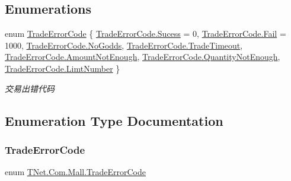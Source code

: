 \subsection*{Enumerations}
\begin{DoxyCompactItemize}
\item 
enum \mbox{\hyperlink{namespace_t_net_1_1_com_1_1_mall_a8ed58f71da1d1495830104612fc5667a}{Trade\+Error\+Code}} \{ \newline
\mbox{\hyperlink{namespace_t_net_1_1_com_1_1_mall_a8ed58f71da1d1495830104612fc5667aae86fe8e3ce45e5c58b6e88a15b0b8a0f}{Trade\+Error\+Code.\+Sucess}} = 0, 
\mbox{\hyperlink{namespace_t_net_1_1_com_1_1_mall_a8ed58f71da1d1495830104612fc5667aaceaa0734f0b3c738120c67344d8f3ec1}{Trade\+Error\+Code.\+Fail}} = 1000, 
\mbox{\hyperlink{namespace_t_net_1_1_com_1_1_mall_a8ed58f71da1d1495830104612fc5667aa6f9b3e0b940a2231afdc200ed3456726}{Trade\+Error\+Code.\+No\+Godds}}, 
\mbox{\hyperlink{namespace_t_net_1_1_com_1_1_mall_a8ed58f71da1d1495830104612fc5667aae61d758b202ccf1b65c3c3b824bb7fa8}{Trade\+Error\+Code.\+Trade\+Timeout}}, 
\newline
\mbox{\hyperlink{namespace_t_net_1_1_com_1_1_mall_a8ed58f71da1d1495830104612fc5667aa8a34aede4f5d84c818d612565a9045e9}{Trade\+Error\+Code.\+Amount\+Not\+Enough}}, 
\mbox{\hyperlink{namespace_t_net_1_1_com_1_1_mall_a8ed58f71da1d1495830104612fc5667aa91d0a8ba65fa602834cc417c103ee1e8}{Trade\+Error\+Code.\+Quantity\+Not\+Enough}}, 
\mbox{\hyperlink{namespace_t_net_1_1_com_1_1_mall_a8ed58f71da1d1495830104612fc5667aa1eca28334689df9342b4c279768edb91}{Trade\+Error\+Code.\+Limt\+Number}}
 \}
\begin{DoxyCompactList}\small\item\em 交易出错代码 \end{DoxyCompactList}\end{DoxyCompactItemize}


\subsection{Enumeration Type Documentation}
\mbox{\label{namespace_t_net_1_1_com_1_1_mall_a8ed58f71da1d1495830104612fc5667a}} 
\subsubsection{\texorpdfstring{Trade\+Error\+Code}{TradeErrorCode}}
{\footnotesize\ttfamily enum \mbox{\hyperlink{namespace_t_net_1_1_com_1_1_mall_a8ed58f71da1d1495830104612fc5667a}{T\+Net.\+Com.\+Mall.\+Trade\+Error\+Code}}\hspace{0.3cm}{\ttfamily [strong]}}



